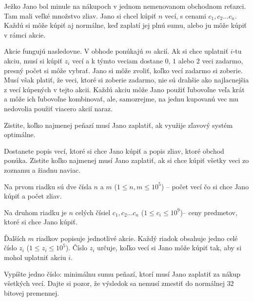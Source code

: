 




Ježko Jano bol minule na nákupoch v jednom nemenovanom obchodnom reťazci. Tam mali veľké množstvo
zliav. Jano si chcel kúpiť $n$ vecí, s cenami $c_1, c_2 \dots c_n$. Každú si môže kúpiť aj normálne,
keď zaplatí jej plnú sumu, alebo ju môže kúpiť v rámci akcie.

Akcie fungujú nasledovne. V obhode ponúkajú $m$ akcií. Ak si chce uplatniť $i$-tu akciu, musí si
kúpiť $z_i$ vecí a k týmto veciam dostane $0$, $1$ alebo $2$ veci zadarmo, presný počet si môže
vybrať. Jano si môže zvoliť, koľko vecí zadarmo si zoberie. Musí však platiť, že veci, ktoré si
zoberie zadarmo, nie sú drahšie ako najlacnejšia z vecí kúpených v tejto akcii. Každú akciu môže
Jano použiť ľubovoľne veľa krát a môže ich ľubovoľne kombinovať, ale, samozrejme, na jednu kupovanú
vec mu nedovolia použiť viacero akcií naraz.

Zistite, koľko najmenej peňazí musí Jano zaplatiť, ak využije zľavový systém optimálne.


Dostanete popis vecí, ktoré si chce Jano kúpiť a popis zliav, ktoré obchod ponúka. Zistite koľko
najmenej musí Jano zaplatiť, ak si chce kúpiť všetky veci zo zoznamu a žiadnu naviac.


Na prvom riadku sú dve čísla $n$ a $m$ ($1 \leq n, m \leq 10^5$) -- počet vecí čo si chce Jano kúpiť
a počet zliav.

Na druhom riadku je $n$ celých čísiel $c_1, c_2 \dots c_n$ ($1 \leq c_i \leq 10^9$)-- ceny predmetov,
ktoré si chce Jano kúpiť.

Ďalších $m$ riadkov popisuje jednotlivé akcie. Každý riadok obsahuje jedno celé číslo $z_i$ ($1 \leq
z_i \leq 10^5$). Číslo $z_i$ určuje, koľko vecí si Jano môže kúpiť tak, aby si mohol uplatniť akciu $i$.


Vypíšte jedno číslo: minimálnu sumu peňazí, ktorí musí Jano zaplatiť za nákup všetkých vecí. Dajte
si pozor, že výsledok sa nemusí zmestiť do normálnej $32$ bitovej premennej.


\vstup
\vystup
\koniec


